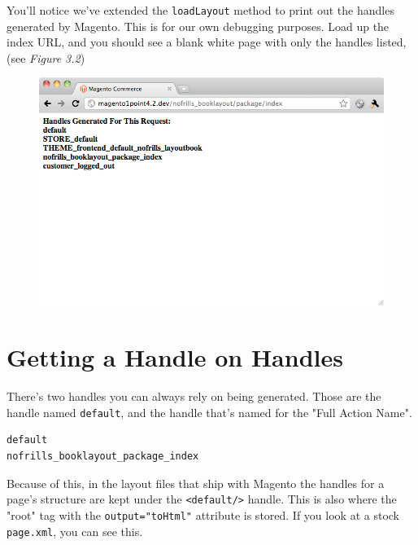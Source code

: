 \documentclass[oneside]{book}
\begin{document}
You'll notice we've extended the \footnotesize\texttt{loadLayout} \normalsize  method to print out the handles generated by Magento.  This is for our own debugging purposes.  Load up the index URL, and you should see a blank white page with only the handles listed, (see \emph{Figure 3.2})

\begin{figure}[htb]
\begin{center}
\leavevmode
\includegraphics[width=1\textwidth]{images/chapter3/blank-with-handles.png}
\end{center}
\caption{}
\end{figure}


\section{Getting a Handle on Handles}

There's two handles you can always rely on being generated.  Those are the handle named \footnotesize\texttt{default}\normalsize, and the handle that's named for the "Full Action Name".  

\begin{lstlisting}
default
nofrills_booklayout_package_index

\end{lstlisting}


Because of this, in the layout files that ship with Magento the handles for a page's structure are kept under the \footnotesize\texttt{\textless default/\textgreater } \normalsize  handle.  This is also where the "root" tag with the \footnotesize\texttt{output="toHtml"} \normalsize  attribute is stored. If you look at a stock \footnotesize\texttt{page.xml}\normalsize, you can see this.
\end{document}
